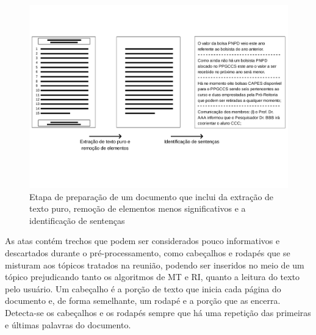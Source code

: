 \begin{center}
	\begin{figure}[h!]

		\includegraphics[trim={ 0 100 0 100 },clip,page=1,width=\textwidth]{conteudo/capitulos/figs/preparacao-docs.pdf}

		\caption{Etapa de preparação de um documento que inclui da extração de texto puro,  remoção de elementos menos significativos e a identificação de sentenças}
		\label{fig:preprocessamento-segmentacao}
	\end{figure}
\end{center}




As atas contém trechos que podem ser considerados pouco informativos e descartados durante o pré-processamento, como cabeçalhos e rodapés que se misturam aos tópicos tratados na reunião, podendo ser inseridos no meio de um tópico prejudicando tanto os algoritmos de MT e RI, quanto a leitura do texto pelo usuário. Um cabeçalho é a porção de texto que inicia cada página do documento e, de forma semelhante, um rodapé e a porção que as encerra. Detecta-se os cabeçalhos e os rodapés sempre que há uma repetição das primeiras e últimas palavras do documento.


